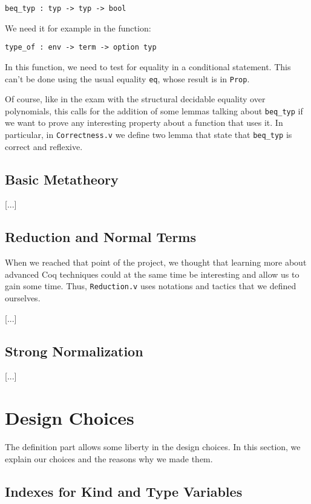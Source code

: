\documentclass[a4paper,11pt]{article}
\begin{document}
\begin{verbatim}
beq_typ : typ -> typ -> bool
\end{verbatim}

We need it for example in the function:

\begin{verbatim}
type_of : env -> term -> option typ
\end{verbatim}

In this function, we need to test for equality in a conditional
statement. This can't be done using the usual equality \verb|eq|,
whose result is in \verb|Prop|.

Of course, like in the exam with the structural decidable equality over
polynomials, this calls for the addition of some lemmas talking about
\verb|beq_typ| if we want to prove any interesting property about a
function that uses it. In particular, in \verb|Correctness.v| we
define two lemma that state that \verb|beq_typ| is correct and
reflexive.

\subsection{Basic Metatheory}

[...]

\subsection{Reduction and Normal Terms}

When we reached that point of the project, we thought that learning
more about advanced Coq techniques could at the same time be
interesting and allow us to gain some time. Thus, \verb|Reduction.v|
uses notations and tactics that we defined ourselves.

[...]

\subsection{Strong Normalization}

[...]


\section{Design Choices}

The definition part allows some liberty in the design choices. In this
section, we explain our choices and the reasons why we made them.

\subsection{Indexes for Kind and Type Variables}
\end{document}
